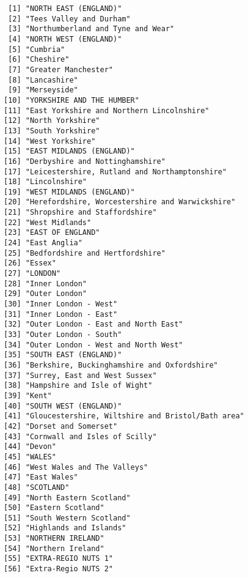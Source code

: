 \documentclass[]{article}
\begin{document}
\begin{verbatim}
 [1] "NORTH EAST (ENGLAND)"                            
 [2] "Tees Valley and Durham"                          
 [3] "Northumberland and Tyne and Wear"                
 [4] "NORTH WEST (ENGLAND)"                            
 [5] "Cumbria"                                         
 [6] "Cheshire"                                        
 [7] "Greater Manchester"                              
 [8] "Lancashire"                                      
 [9] "Merseyside"                                      
[10] "YORKSHIRE AND THE HUMBER"                        
[11] "East Yorkshire and Northern Lincolnshire"        
[12] "North Yorkshire"                                 
[13] "South Yorkshire"                                 
[14] "West Yorkshire"                                  
[15] "EAST MIDLANDS (ENGLAND)"                         
[16] "Derbyshire and Nottinghamshire"                  
[17] "Leicestershire, Rutland and Northamptonshire"    
[18] "Lincolnshire"                                    
[19] "WEST MIDLANDS (ENGLAND)"                         
[20] "Herefordshire, Worcestershire and Warwickshire"  
[21] "Shropshire and Staffordshire"                    
[22] "West Midlands"                                   
[23] "EAST OF ENGLAND"                                 
[24] "East Anglia"                                     
[25] "Bedfordshire and Hertfordshire"                  
[26] "Essex"                                           
[27] "LONDON"                                          
[28] "Inner London"                                    
[29] "Outer London"                                    
[30] "Inner London - West"                             
[31] "Inner London - East"                             
[32] "Outer London - East and North East"              
[33] "Outer London - South"                            
[34] "Outer London - West and North West"              
[35] "SOUTH EAST (ENGLAND)"                            
[36] "Berkshire, Buckinghamshire and Oxfordshire"      
[37] "Surrey, East and West Sussex"                    
[38] "Hampshire and Isle of Wight"                     
[39] "Kent"                                            
[40] "SOUTH WEST (ENGLAND)"                            
[41] "Gloucestershire, Wiltshire and Bristol/Bath area"
[42] "Dorset and Somerset"                             
[43] "Cornwall and Isles of Scilly"                    
[44] "Devon"                                           
[45] "WALES"                                           
[46] "West Wales and The Valleys"                      
[47] "East Wales"                                      
[48] "SCOTLAND"                                        
[49] "North Eastern Scotland"                          
[50] "Eastern Scotland"                                
[51] "South Western Scotland"                          
[52] "Highlands and Islands"                           
[53] "NORTHERN IRELAND"                                
[54] "Northern Ireland"                                
[55] "EXTRA-REGIO NUTS 1"                              
[56] "Extra-Regio NUTS 2"                              
\end{verbatim}
\end{document}
